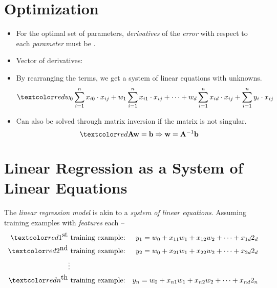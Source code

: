 \documentclass[
	number={5},
	title={Linear Regression}
]{cs584notes}
\begin{document}
\section{Optimization}\label{sec:optimization}
\begin{itemize}
	\item For the optimal set of parameters, \emph{derivatives} of the \emph{error} with respect to each \emph{parameter} must be .
	\item Vector of derivatives:
	\item By rearranging the terms, we get a system of linear equations with  unknowns.
	\[ \data{ w_{0}\sum_{i=1}^{n} x_{i0}\cdot x_{ij} + w_{1}\sum_{i=1}^{n} x_{i1}\cdot x_{ij} + \dots + w_{d}\sum_{i=1}^{n} x_{id}\cdot x_{ij} + \sum_{i=1}^{n} y_{i}\cdot x_{ij} } \]
	\item Can also be solved through matrix inversion if the matrix is not singular.
	\[ \data{ \vec{A}\vec{w} = \vec{b} \Rightarrow \vec{w} = \vec{A}^{-1}\vec{b} } \]
\end{itemize}

\section{Linear Regression as a System of Linear Equations}\label{sec:linear-regression-as-a-system-of-linear-equations}
The \emph{linear regression model} is akin to a \emph{system of linear equations}.
Assuming  training examples with  \emph{features} each --
\begin{equation*}
\begin{aligned}
	\data{1^{\mbox{st}}} & \mbox{ training example:} & y_{1} = w_{0} + x_{11}w_{1} + x_{12}w_{2} + \dots + x_{1d}2_{d}\\
	\data{2^{\mbox{nd}}} & \mbox{ training example:} & y_{2} = w_{0} + x_{21}w_{1} + x_{22}w_{2} + \dots + x_{2d}2_{d}\\
	 & \vdots & \\
	\data{n^{\mbox{th}}} & \mbox{ training example:} & y_{n} = w_{0} + x_{n1}w_{1} + x_{n2}w_{2} + \dots + x_{nd}2_{n}\\
\end{aligned}
\end{equation*}
\end{document}
